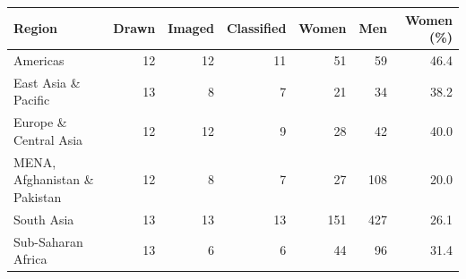 \begin{tabular}{lrrrrrr}
\toprule
Region & Drawn & Imaged & Classified & Women & Men & Women (\%) \\
\midrule
Americas & 12 & 12 & 11 & 51 & 59 & 46.4 \\
East Asia \& Pacific & 13 & 8 & 7 & 21 & 34 & 38.2 \\
Europe \& Central Asia & 12 & 12 & 9 & 28 & 42 & 40.0 \\
MENA, Afghanistan \& Pakistan & 12 & 8 & 7 & 27 & 108 & 20.0 \\
South Asia & 13 & 13 & 13 & 151 & 427 & 26.1 \\
Sub-Saharan Africa & 13 & 6 & 6 & 44 & 96 & 31.4 \\
\bottomrule
\end{tabular}

